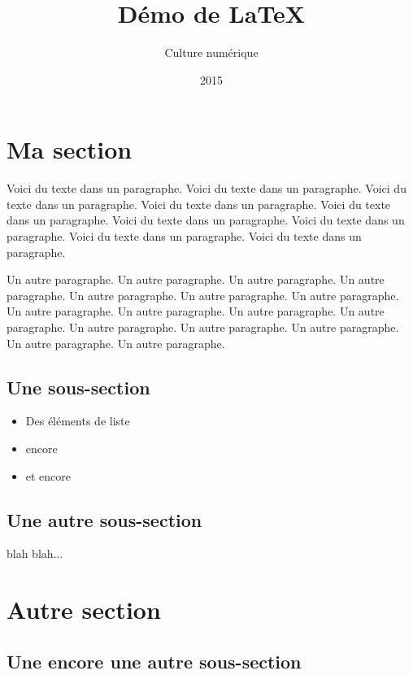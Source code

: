 \documentclass{article}
\title{Démo de \LaTeX}
\author{Culture numérique}
\date{2015}
\begin{document}
\maketitle

\tableofcontents

\section{Ma section}
Voici du texte dans un paragraphe. Voici du texte dans un paragraphe. Voici du texte dans un paragraphe. Voici du texte dans un paragraphe. Voici du texte dans un paragraphe. Voici du texte dans un paragraphe. Voici du texte dans un paragraphe. Voici du texte dans un paragraphe. Voici du texte dans un paragraphe. 

Un autre paragraphe. Un autre paragraphe. Un autre paragraphe. Un autre paragraphe. Un autre paragraphe. Un autre paragraphe. Un autre paragraphe. Un autre paragraphe. Un autre paragraphe. Un autre paragraphe. Un autre paragraphe. Un autre paragraphe. Un autre paragraphe. Un autre paragraphe. Un autre paragraphe. Un autre paragraphe. 

\subsection{Une sous-section}

\begin{itemize}
\item Des éléments de liste
\item encore
\item et encore
\end{itemize}

\subsection{Une autre sous-section}

blah blah...

\section{Autre section}

\subsection{Une encore une autre sous-section}
\end{document}

